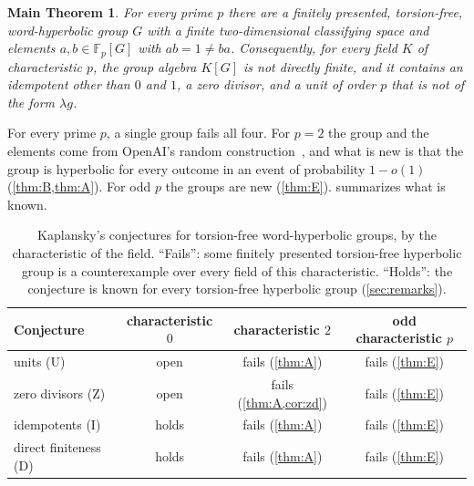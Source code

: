 \documentclass[11pt]{article}
\theoremstyle{definition}
\theoremstyle{plain}
\newtheorem*{mainthm}{Main Theorem}
\newcommand{\F}{\mathbb{F}}
\begin{document}
\begin{tcolorbox}[headline]
\begin{mainthm}
For every prime $p$ there are a finitely presented, torsion-free, word-hyperbolic group $G$ with a finite two-dimensional classifying space and elements $a,b\in\F_p[G]$ with $ab=1\neq ba$. Consequently, for every field $K$ of characteristic $p$, the group algebra $K[G]$ is not directly finite, and it contains an idempotent other than $0$ and $1$, a zero divisor, and a unit of order $p$ that is not of the form $\lambda g$.
\end{mainthm}
\end{tcolorbox}

\noindent For every prime $p$, a single group fails all four. For $p=2$ the group and the elements come from OpenAI's random construction~\cite{OAI197a}, and what is new is that the group is hyperbolic for every outcome in an event of probability $1-o(1)$ (\cref{thm:B,thm:A}). For odd $p$ the groups are new (\cref{thm:E}).  summarizes what is known.

\begin{table}[ht]
\centering\small
\begin{tabular}{@{}lccc@{}}
\toprule
Conjecture & characteristic $0$ & characteristic $2$ & odd characteristic $p$\\
\midrule
units (U) & open & fails (\cref{thm:A}) & fails (\cref{thm:E})\\
zero divisors (Z) & open & fails (\cref{thm:A,cor:zd}) & fails (\cref{thm:E})\\
idempotents (I) & holds & fails (\cref{thm:A}) & fails (\cref{thm:E})\\
direct finiteness (D) & holds & fails (\cref{thm:A}) & fails (\cref{thm:E})\\
\bottomrule
\end{tabular}
\caption{Kaplansky's conjectures for torsion-free word-hyperbolic groups, by the characteristic of the field. ``Fails'': some finitely presented torsion-free hyperbolic group is a counterexample over every field of this characteristic. ``Holds'': the conjecture is known for every torsion-free hyperbolic group (\cref{sec:remarks}).}
\label{tab:status}
\end{table}
\end{document}
